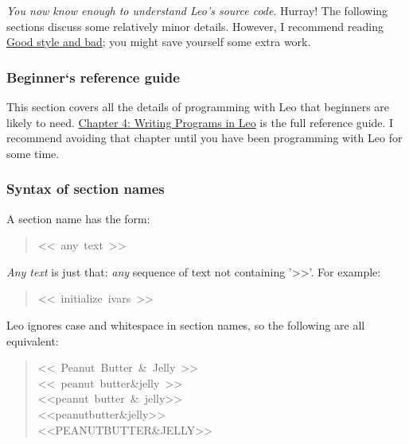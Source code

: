 \documentclass[10pt,a4paper,english]{article}
\newcommand{\titlereference}[1]{\textsl{#1}}
\begin{document}
\emph{You now know enough to understand Leo's source code}.  Hurray!
The following sections discuss some relatively minor details.
However, I recommend reading \href{\#good-style-and-bad-sections-vs-others}{Good style and bad};
you might save yourself some extra work.



\hypertarget{beginner-s-reference-guide}{}
\subsubsection*{Beginner`s reference guide}

This section covers all the details of programming with Leo that beginners are likely to need.
\href{directives.html}{Chapter 4: Writing Programs in Leo} is the full reference guide.
I recommend avoiding that chapter until you have been programming with Leo for some time.



\hypertarget{syntax-of-section-names}{}
\subsubsection*{Syntax of section names}

A section name has the form:
\begin{quote}{\ttfamily \raggedright \noindent
<{}<~any~text~>{}>
}\end{quote}

\titlereference{Any text} is just that: \emph{any} sequence of text not containing '{\textgreater}{\textgreater}'.  For example:
\begin{quote}{\ttfamily \raggedright \noindent
<{}<~initialize~ivars~>{}>
}\end{quote}

Leo ignores case and whitespace in section names, so the following are all equivalent:
\begin{quote}{\ttfamily \raggedright \noindent
<{}<~Peanut~Butter~{\&}~Jelly~>{}>~\\
<{}<~peanut~butter{\&}jelly~>{}>~\\
<{}<peanut~butter~{\&}~jelly>{}>~\\
<{}<peanutbutter{\&}jelly>{}>~\\
<{}<PEANUTBUTTER{\&}JELLY>{}>
}\end{quote}
\end{document}

